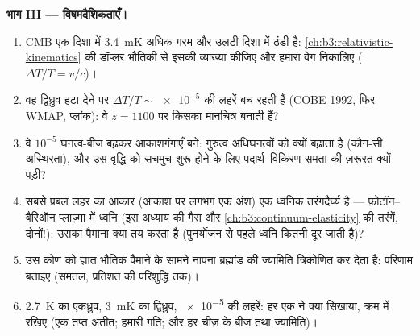 \begin{problem}
\medskip\noindent\textbf{भाग III --- विषमदैशिकताएँ।}
\begin{enumerate}[resume]
  \item CMB एक दिशा में \qty{3.4}{mK} अधिक गरम और उलटी दिशा में
        ठंडी है: \cref{ch:b3:relativistic-kinematics} की डॉप्लर
        भौतिकी से इसकी व्याख्या कीजिए और हमारा
        वेग निकालिए ($\Delta T/T = v/c$)।
  \item वह द्विध्रुव हटा देने पर $\Delta T/T \sim
        \num{e-5}$ की लहरें बच रहती हैं (COBE 1992, फिर WMAP,
        प्लांक): वे $z = 1100$ पर किसका मानचित्र बनाती हैं?
  \item वे $10^{-5}$ घनत्व-बीज बढ़कर आकाशगंगाएँ बने: गुरुत्व
        अधिघनत्वों को क्यों बढ़ाता है (कौन-सी अस्थिरता), और उस
        वृद्धि को सचमुच शुरू होने के लिए पदार्थ--विकिरण समता की
        ज़रूरत क्यों पड़ी?
  \item सबसे प्रबल लहर का आकार (आकाश पर लगभग एक अंश) एक ध्वनिक
        तरंगदैर्घ्य है --- फ़ोटॉन--बैरिऑन प्लाज़्मा में ध्वनि (इस
        अध्याय की गैस और
        \cref{ch:b3:continuum-elasticity} की तरंगें, दोनों!): उसका
        पैमाना क्या तय करता है (पुनर्योजन से पहले ध्वनि कितनी दूर
        जाती है)?
  \item उस कोण को ज्ञात भौतिक पैमाने के सामने नापना ब्रह्मांड की
        ज्यामिति त्रिकोणित कर देता है: परिणाम बताइए (समतल, प्रतिशत
        की परिशुद्धि तक)।
  \item \qty{2.7}{K} का एकध्रुव, \qty{3}{mK} का द्विध्रुव,
        \num{e-5} की लहरें: हर एक ने क्या सिखाया, क्रम में रखिए
        (एक तप्त अतीत; हमारी गति; और हर चीज़ के बीज तथा ज्यामिति)।
\end{enumerate}


\end{problem}
